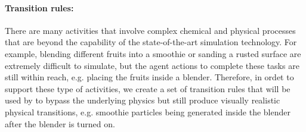 \paragraph{Transition rules:} There are many activities that involve complex chemical and physical processes that are beyond the capability of the state-of-the-art simulation technology. For example, blending different fruits into a smoothie or sanding a rusted surface are extremely difficult to simulate, but the agent actions to complete these tasks are still within reach, e.g. placing the fruits inside a blender. Therefore, in ordet to support these type of activities, we create a set of transition rules that will be used by \simulator to bypass the underlying physics but still produce visually realistic physical transitions, e.g. smoothie particles being generated inside the blender after the blender is turned on.


